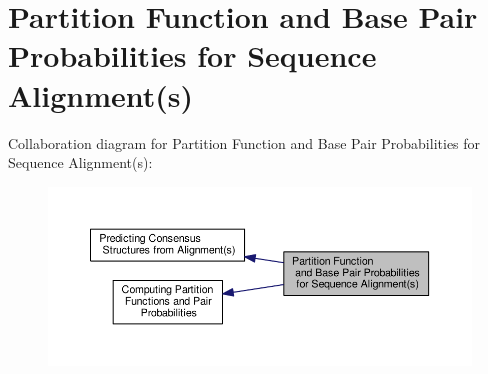 \hypertarget{group__consensus__pf__fold}{\section{Partition Function and Base Pair Probabilities for Sequence Alignment(s)}
\label{group__consensus__pf__fold}
}
Collaboration diagram for Partition Function and Base Pair Probabilities for Sequence Alignment(s)\-:
\nopagebreak
\begin{figure}[H]
\begin{center}
\leavevmode
\includegraphics[width=350pt]{group__consensus__pf__fold}
\end{center}
\end{figure}
